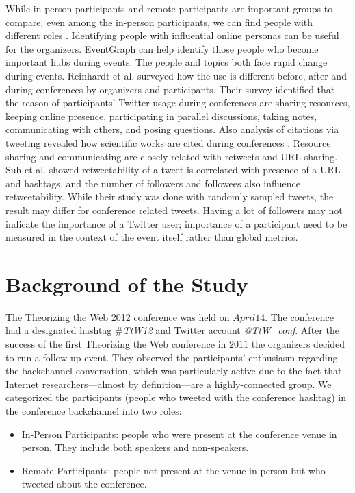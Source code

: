 \documentclass[conference,final]{IEEEtran}
\begin{document}
While in-person participants and remote participants are important groups to compare, even among the in-person participants, we can find people with different roles \cite{ross2011enabled}. Identifying people with influential online personas can be useful for the organizers. EventGraph \cite{eventgraph} can help identify those people who become important hubs during events. The people and topics both face rapid change during events. Reinhardt et al. \cite{twitterinconf} surveyed how the use is different before, after and during conferences by organizers and participants. Their survey identified that the reason of participants' Twitter usage during conferences are sharing resources, keeping online presence, participating in parallel discussions, taking notes, communicating with others, and posing questions. Also analysis of citations via tweeting revealed how scientific works are cited during conferences \cite{citation}. Resource sharing and communicating are closely related with retweets and URL sharing. Suh et al. \cite{retweet} showed retweetability of a tweet is correlated with presence of a URL and hashtags, and the number of followers and followees also influence retweetability. While their study was done with randomly sampled tweets, the result may differ for conference related tweets. Having a lot of followers may not indicate the importance of a Twitter user\cite{million}; importance of a participant need to be measured in the context of the event itself rather than global metrics.

\section{Background of the Study}
The Theorizing the Web 2012 conference was held on $April 14$. The conference had a designated hashtag \textit{$\#$TtW12} and Twitter account \textit{@TtW\_conf}. After the success of the first Theorizing the Web conference in $2011$ the organizers decided to run a follow-up event. They observed the participants' enthusiasm regarding the backchannel conversation, which was particularly active due to the fact that Internet researchers---almost by definition---are a highly-connected group. We categorized the participants (people who tweeted with the conference hashtag) in the conference backchannel into two roles: 
\begin{itemize}
	\item In-Person Participants: people who were present at the conference venue in person. They include both speakers and non-speakers.
  \item Remote Participants: people not present at the venue in person but who tweeted about the conference.
\end{itemize}
\end{document}
